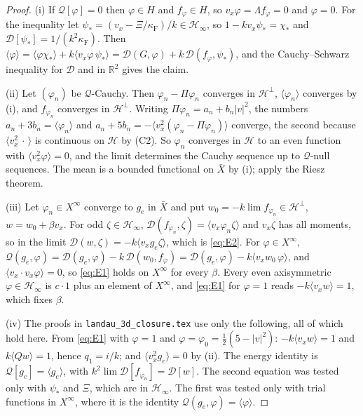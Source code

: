 \documentclass[11pt]{article}
\newcommand{\cD}{\mathcal{D}}
\newcommand{\cH}{\mathcal{H}}
\newcommand{\cQ}{\mathcal{Q}}
\newcommand{\avg}[1]{\langle #1\rangle}
\theoremstyle{remark}
\begin{document}
\begin{proof}
(i) If $\cQ[\varphi]=0$ then $\varphi\in H$ and $f_\varphi\in H$, so
$v_x\varphi=\Lambda f_\varphi=0$ and $\varphi=0$. For the inequality let
$\psi_*=(v_x-\Xi/\kappa_{\mathrm F})/k\in\cH_\infty$, so
$1-kv_x\psi_*=\chi_*$ and $\cD[\psi_*]=1/(k^2\kappa_{\mathrm F})$. Then
$\avg{\varphi}=\avg{\varphi\chi_*}+k\avg{v_x\varphi\,\psi_*}
=\cD(G,\varphi)+k\,\cD(f_\varphi,\psi_*)$, and the Cauchy--Schwarz inequality
for $\cD$ and in $\mathbb{R}^2$ gives the claim.

(ii) Let $(\varphi_n)$ be $\cQ$-Cauchy. Then $\varphi_n-\Pi\varphi_n$
converges in $\cH^\perp$, $\avg{\varphi_n}$ converges by (i), and
$f_{\varphi_n}$ converges in $\cH^\perp$. Writing
$\Pi\varphi_n=a_n+b_n|v|^2$, the numbers $a_n+3b_n=\avg{\varphi_n}$ and
$a_n+5b_n=-\avg{v_x^2(\varphi_n-\Pi\varphi_n)}$ converge, the second because
$\avg{v_x^2\,\cdot\,}$ is continuous on $\cH$ by (C2). So $\varphi_n$
converges in $\cH$ to an even function with $\avg{v_x^2\varphi}=0$, and the
limit determines the Cauchy sequence up to $\cQ$-null sequences. The mean is
a bounded functional on $\bar X$ by (i); apply the Riesz theorem.

(iii) Let $\varphi_n\in X^\infty$ converge to $g_e$ in $\bar X$ and put
$w_0=-k\lim f_{\varphi_n}\in\cH^\perp$, $w=w_0+\beta v_x$. For odd
$\zeta\in\cH_\infty$, $\cD(f_{\varphi_n},\zeta)=\avg{v_x\varphi_n\zeta}$ and
$v_x\zeta$ has all moments, so in the limit
$\cD(w,\zeta)=-k\avg{v_xg_e\zeta}$, which is \eqref{eq:E2}. For
$\varphi\in X^\infty$,
$\cQ(g_e,\varphi)=\cD(g_e,\varphi)-k\,\cD(w_0,f_\varphi)
=\cD(g_e,\varphi)-k\avg{v_xw_0\,\varphi}$, and $\avg{v_x\cdot v_x\varphi}=0$,
so \eqref{eq:E1} holds on $X^\infty$ for every $\beta$. Every even
axisymmetric $\varphi\in\cH_\infty$ is $c\cdot1$ plus an element of
$X^\infty$, and \eqref{eq:E1} for $\varphi=1$ reads $-k\avg{v_xw}=1$, which
fixes $\beta$.

(iv) The proofs in \texttt{landau\_3d\_closure.tex} use only the following,
all of which hold here. From \eqref{eq:E1} with $\varphi=1$ and
$\varphi=\varphi_0=\tfrac12(5-|v|^2)$: $-k\avg{v_xw}=1$ and
$k\avg{Qw}=1$, hence $q_1=i/k$; and $\avg{v_x^2g_e}=0$ by (ii). The energy
identity is $\cQ[g_e]=\avg{g_e}$, with $k^2\lim\cD[f_{\varphi_n}]=\cD[w]$.
The second equation was tested only with $\psi_*$ and $\Xi$, which are in
$\cH_\infty$. The first was tested only with trial functions in $X^\infty$,
where it is the identity $\cQ(g_e,\varphi)=\avg{\varphi}$.
\end{proof}
\end{document}
